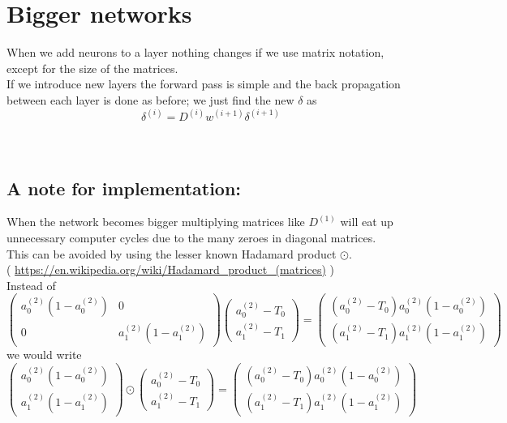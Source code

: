 \documentclass{article}
\begin{document}
\section*{Bigger networks}
When we add neurons to a layer nothing changes if we use matrix notation, except for the size of the matrices.
\\
If we introduce new layers the forward pass is simple and the back propagation between each layer is done as before; we just find the new $\delta$ as $$\delta^{(i)} = D^{(i)} w^{(i+1)} \delta^{(i+1)}$$
\\
\\
\subsection*{A note for implementation:}
When the network becomes bigger multiplying matrices like $D^{(1)}$ will eat up unnecessary computer cycles due to the many zeroes in diagonal matrices.
\\
This can be avoided by using the lesser known Hadamard product $\odot$. 
\\
( \url{https://en.wikipedia.org/wiki/Hadamard_product_(matrices)} )
\\
Instead of
\[
\begin{pmatrix}
a_{0}^{(2)}(1-a_{0}^{(2)}) & 0 \\
0 & a_{1}^{(2)}(1-a_{1}^{(2)})
\end{pmatrix}
\begin{pmatrix}
a_{0}^{(2)}-T_0 \\ a_{1}^{(2)}-T_1
\end{pmatrix} =
\begin{pmatrix}
(a_0^{(2)}-T_0)a_0^{(2)}(1-a_0^{(2)}) \\ (a_1^{(2)}-T_1)a_1^{(2)}(1-a_1^{(2)})
\end{pmatrix}
\]
we would write
\\
\[
\begin{pmatrix}
a_{0}^{(2)}(1-a_{0}^{(2)}) \\
a_{1}^{(2)}(1-a_{1}^{(2)})
\end{pmatrix}
\odot
\begin{pmatrix}
a_{0}^{(2)}-T_0 \\ a_{1}^{(2)}-T_1
\end{pmatrix} =
\begin{pmatrix}
(a_0^{(2)}-T_0)a_0^{(2)}(1-a_0^{(2)}) \\ (a_1^{(2)}-T_1)a_1^{(2)}(1-a_1^{(2)})
\end{pmatrix}
\]
\\
\\
\\
\\
\\
\end{document}
